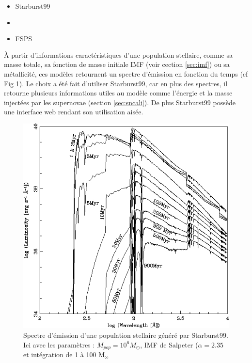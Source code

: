 \begin{itemize}
\item Starburst99 \cite{leitherer_starburst99:_1999} 
\item \cite{2003MNRAS.344.1000B}
\item FSPS \cite{2009ApJ...699..486C}
\end{itemize}

À partir d'informations caractéristiques d'une population stellaire, comme sa masse totale, sa fonction de masse initiale \ac{IMF} (voir cection \ref{sec:imf}) ou sa métallicité, ces modèles retournent un spectre d'émission en fonction du temps (cf Fig \ref{fig:spectre_starburst}).
Le choix a été fait d'utiliser Starburst99, car en plus des spectres, il retourne plusieurs informations utiles au modèle comme l'énergie et la masse injectées par les supernovae (section \ref{sec:sncali}).
De plus Starburst99 possède une interface web rendant son utilisation aisée.

\begin{figure}
        \includegraphics[width=.95\linewidth]{img/03/spectre_starburst.jpg} 
        \caption[Spectres Starburst99]{Spectre d'émission d'une population stellaire généré par Starburst99.
        Ici avec les paramètres : $M_{pop}=10^6 M_\odot$, \ac{IMF} de Salpeter ($\alpha=2.35$ et intégration de 1 à 100 M$_\odot$ 
 		\label{fig:spectre_starburst}}
\end{figure}

